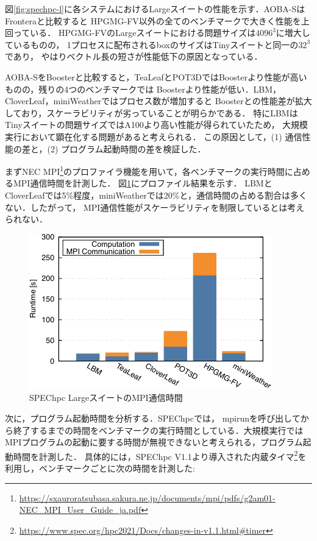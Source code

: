 ﻿\documentclass[submit,techrep,noauthor]{ipsj}
\begin{document}
図\ref{fig:spechpc-l}に各システムにおけるLargeスイートの性能を示す．AOBA-SはFronteraと比較すると
HPGMG-FV以外の全てのベンチマークで大きく性能を上回っている．
HPGMG-FVのLargeスイートにおける問題サイズは$4096^3$に増大しているものの，
1プロセスに配布されるboxのサイズはTinyスイートと同一の$32^3$であり，
やはりベクトル長の短さが性能低下の原因となっている．

AOBA-SをBoosterと比較すると，TeaLeafとPOT3DではBoosterより性能が高いものの，残りの4つのベンチマークでは
Boosterより性能が低い．LBM，CloverLeaf，miniWeatherではプロセス数が増加すると
Boosterとの性能差が拡大しており，スケーラビリティが劣っていることが明らかである．
特にLBMはTinyスイートの問題サイズではA100より高い性能が得られていたため，
大規模実行において顕在化する問題があると考えられる．
この原因として，(1) 通信性能の差と，(2) プログラム起動時間の差を検証した．

まずNEC MPI\footnote{\url{https://sxauroratsubasa.sakura.ne.jp/documents/mpi/pdfs/g2am01-NEC_MPI_User_Guide_ja.pdf}}のプロファイラ機能を用いて，各ベンチマークの実行時間に占めるMPI通信時間を計測した．
図\ref{fig:spechpc-profile1}にプロファイル結果を示す．
LBMとCloverLeafでは5\%程度，miniWeatherでは20\%と，通信時間の占める割合は多くない．したがって，
MPI通信性能がスケーラビリティを制限しているとは考えられない．

\begin{figure}[tb]
  \centering
  \includegraphics{figs/spechpc_profile.pdf}
  \caption{SPEChpc LargeスイートのMPI通信時間}\label{fig:spechpc-profile1}
\end{figure}

次に，プログラム起動時間を分析する．SPEChpcでは，
mpirunを呼び出してから終了するまでの時間をベンチマークの実行時間としている．大規模実行では
MPIプログラムの起動に要する時間が無視できないと考えられる，プログラム起動時間を計測した．
具体的には，SPEChpc
V1.1より導入された内蔵タイマ\footnote{\url{https://www.spec.org/hpc2021/Docs/changes-in-v1.1.html#timer}}を利用し，ベンチマークごとに次の時間を計測した:
\end{document}
